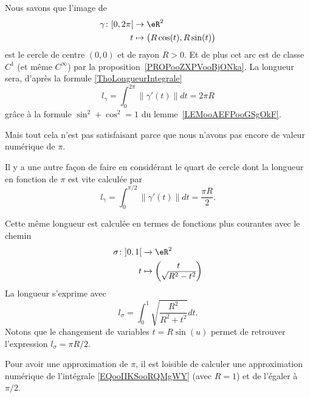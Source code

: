 \begin{example}
	Nous savons que l'image de
	\begin{equation}
		\begin{aligned}
			\gamma\colon \mathopen[ 0 , 2\pi \mathclose[ & \to \eR^2                             \\
			t                                            & \mapsto \big( R\cos(t),R\sin(t) \big)
		\end{aligned}
	\end{equation}
	est le cercle de centre \( (0,0)\) et de rayon \( R>0\). Et de plus cet arc est de classe \( C^1\) (et même \(  C^{\infty}\)) par la proposition~\ref{PROPooZXPVooBjONka}. La longueur sera, d'après la formule \eqref{ThoLongueurIntegrale}
	\begin{equation}
		l_{\gamma}=\int_0^{2\pi}\| \gamma'(t) \|dt=2\pi R
	\end{equation}
	grâce à la formule \( \sin^2+\cos^2=1\) du lemme~\ref{LEMooAEFPooGSgOkF}.

	Mais tout cela n'est pas satisfaisant parce que nous n'avons pas encore de valeur numérique de \( \pi\).

	Il y a une autre façon de faire en considérant le quart de cercle dont la longueur en fonction de \( \pi\) est vite calculée par
	\begin{equation}
		l_{\gamma}=\int_0^{\pi/2}\| \gamma'(t) \|dt=\frac{ \pi R }{ 2 }.
	\end{equation}

	Cette même longueur est calculée en termes de fonctions plus courantes avec le chemin
	\begin{equation}
		\begin{aligned}
			\sigma\colon \mathopen] 0 , 1 \mathclose[ & \to \eR^2               \\
			t                                         & \mapsto \begin{pmatrix}
				                                                    t \\
				                                                    \sqrt{ R^2-t^2 }
			                                                    \end{pmatrix}
		\end{aligned}
	\end{equation}
	La longueur s'exprime avec
	\begin{equation}        \label{EQooIIKSooRQMgWY}
		l_{\sigma}=\int_0^1\sqrt{ \frac{ R^2 }{ R^2+t^2 } }dt.
	\end{equation}
	Notons que le changement de variables \( t=R\sin(u)\) permet de retrouver l'expression \( l_{\sigma}=\pi R/2\).

	Pour avoir une approximation de \( \pi\), il est loisible de calculer une approximation numérique de l'intégrale \eqref{EQooIIKSooRQMgWY} (avec \( R=1\)) et de l'égaler à \( \pi/2\).
\end{example}


